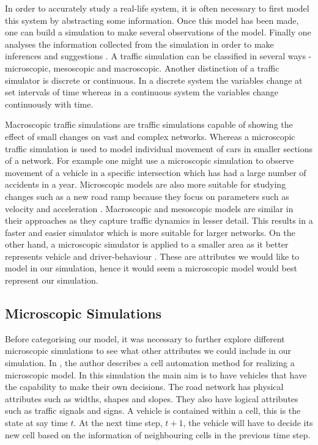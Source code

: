 \documentclass{article}
\begin{document}
	In order to accurately study a real-life system, it is often necessary to first model this system by abstracting some information. 
	Once this model has been made, one can build a simulation to make several observations of the model. 
	Finally one analyses the information collected from the simulation in order to make inferences and suggestions \cite{sokolowski2011principles}. 
	A traffic simulation can be classified in several ways - microscopic, mesoscopic and macroscopic. 
	Another distinction of a traffic simulator is discrete or continuous. 
	In a discrete system the variables change at set intervals of time whereas in a continuous system the variables change continuously with time. 
	
	Macroscopic traffic simulations are traffic simulations capable of showing the effect of small changes on vast and complex networks. 
	Whereas a microscopic traffic simulation is used to model individual movement of cars  in smaller sections of a network. 
	For example one might use a microscopic simulation to observe movement of a vehicle in a specific intersection which has had a large number of accidents in a year. 
	Microscopic models are also more suitable for studying changes such as a new road ramp because they focus on parameters such as velocity and acceleration \cite{sokolowski2011principles}. 
	Macroscopic and mesoscopic models are similar in their approaches as they capture traffic dynamics in lesser detail. 
	This results in a faster and easier simulator which is more suitable for larger networks. 
	On the other hand, a microscopic simulator is applied to a smaller area as it better represents vehicle and driver-behaviour \cite{burghout2005hybrid}. 
	These are attributes we would like to model in our simulation, hence it would seem a microscopic model would best represent our simulation. 
	
	
	\subsection{Microscopic Simulations}
	
	Before categorising our model, it was necessary to further explore different microscopic simulations to see what other attributes we could include in our simulation.
	In \cite{namekawa2005general}, the author describes a cell automation method for realizing a microscopic model. 
	In this simulation the main aim is to have vehicles that have the capability to make their own decisions. 
	The road network has physical attributes such as widths, shapes and slopes. 
	They also have logical attributes such as traffic signals and signs. 
	A vehicle is contained within a cell, this is the state at say time $t$. 
	At the next time step, $t+1$, the vehicle will have to decide its new cell based on the information of neighbouring cells in the previous time step. 
	
\end{document}

